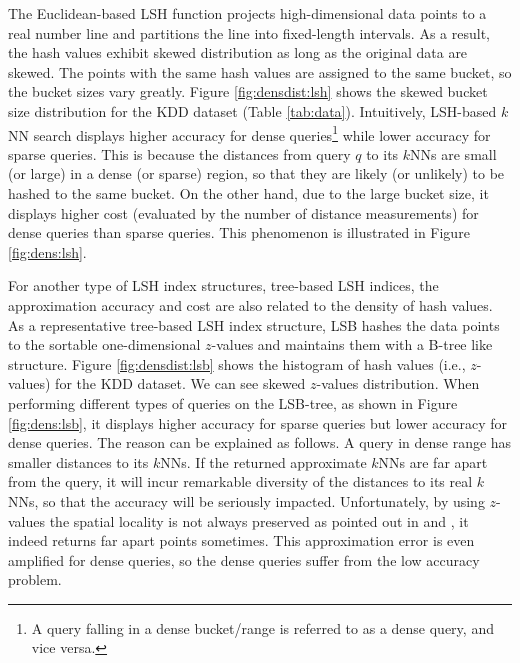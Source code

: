 The Euclidean-based LSH function \cite{datar} projects high-dimensional data points to a real number line and partitions the line into fixed-length intervals. As a result, the hash values exhibit skewed distribution as long as the original data are skewed. The points with the same hash values are assigned to the same bucket, so the bucket sizes vary greatly. Figure \ref{fig:densdist:lsh} shows the skewed bucket size distribution for the KDD dataset (Table \ref{tab:data}). Intuitively, LSH-based $k$NN search displays higher accuracy for dense queries\footnote{A query falling in a dense bucket/range is referred to as a dense query, and vice versa.} while lower accuracy for sparse queries. This is because the distances from query $q$ to its $k$NNs are small (or large) in a dense (or sparse) region, so that they are likely (or unlikely) to be hashed to the same bucket. On the other hand, due to the large bucket size, it displays higher cost (evaluated by the number of distance measurements) for dense queries than sparse queries. This phenomenon is illustrated in Figure \ref{fig:dens:lsh}. %

For another type of LSH index structures, tree-based LSH indices, the approximation accuracy and cost are also related to the density of hash values. As a representative tree-based LSH index structure, LSB \cite{lsb} hashes the data points to the sortable one-dimensional $z$-values and maintains them with a B-tree like structure. Figure \ref{fig:densdist:lsb} shows the histogram of hash values (i.e., $z$-values) for the KDD dataset. We can see skewed $z$-values distribution. When performing different types of queries on the LSB-tree, as shown in Figure \ref{fig:dens:lsb}, it displays higher accuracy for sparse queries but lower accuracy for dense queries. The reason can be explained as follows. A query in dense range has smaller distances to its $k$NNs. If the returned approximate $k$NNs are far apart from the query, it will incur remarkable diversity of the distances to its real $k$NNs, so that the accuracy will be seriously impacted. Unfortunately, by using $z$-values the spatial locality is not always preserved as pointed out in \cite{zorkderknn} and \cite{Zhang:2012:EPK:2247596.2247602}, it indeed returns far apart points sometimes. This approximation error is even amplified for dense queries, so the dense queries suffer from the low accuracy problem.


